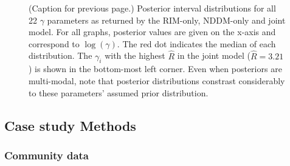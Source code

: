 \begin{refsection}
    \restoregeometry

    \addtocounter{figure}{-1}
    \begin{figure} [t!]
        \caption{(Caption for previous page.) Posterior interval distributions for all 22 $\gamma$ parameters as returned by the RIM-only, NDDM-only and joint model. For all graphs, posterior values are given on the x-axis and correspond to $\log(\gamma)$. The red dot indicates the median of each distribution. The $\gamma_i$ with the highest $\hat{R}$ in the joint model ($\hat{R} = 3.21$) is shown in the bottom-most left corner. Even when posteriors are multi-modal, note that posterior distributions constrast considerably to these parameters' assumed prior distribution.}
        \label{fig:gamma_all}
    \end{figure}

    \subsection{Case study Methods}
    \label{SI:casestudy}

        \subsubsection{Community data}


\end{refsection}
